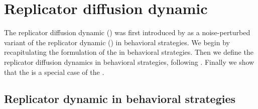 \section{Replicator diffusion dynamic}

The replicator diffusion dynamic (\rdd) was first introduced by
\citet{Correia2013:The-Bivalent-Tr} as a noise-perturbed variant of
the replicator dynamic (\rd) in behavioral strategies. We begin by
recapitulating the formulation of the \rd in behavioral
strategies. Then we define the replicator diffusion dynamics in
behavioral strategies, following \citet{Correia2013:The-Bivalent-Tr}.
Finally we show that the \rdd is a special case of the \rmd.

\subsection{Replicator dynamic in behavioral strategies}

